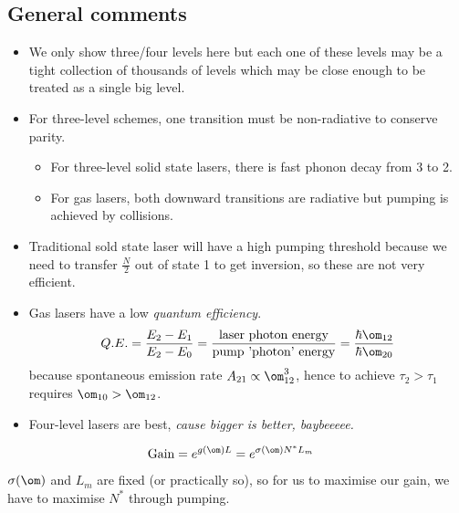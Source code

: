 \documentclass[a4paper, 11pt, normalem]{report}
\begin{document}
\subsection{General comments}
\begin{itemize}
    \item We only show three/four levels here but each one of these levels may be a tight collection of thousands of levels which may be close enough to be treated as a single big level.
    \item For three-level schemes, one transition must be non-radiative to conserve parity.
        \begin{itemize}
            \item For three-level solid state lasers, there is fast phonon decay from 3 to 2.
            \item For gas lasers, both downward transitions are radiative but pumping is achieved by collisions.
        \end{itemize}
    \item Traditional sold state laser will have a high pumping threshold because we need to transfer $\frac{N}{2}$ out of state 1 to get inversion, so these are not very efficient.
    \item Gas lasers have a low \emph{quantum efficiency}.
        \begin{equation}
            Q.E. = \frac{E_2-E_1}{E_2-E_0} = \frac{\text{laser photon energy}}{\text{pump 'photon' energy}} = \frac{\hbar\om_{12}}{\hbar\om_{20}}
        \end{equation}
        because spontaneous emission rate $A_{21}\propto\om_{12}^3$, hence to achieve $\tau_2>\tau_1$ requires $\om_{10}>\om_{12}$.
    \item Four-level lasers are best, \emph{cause bigger is better, baybeeeee.}
\end{itemize}
\begin{align}
    \text{Gain} &= e^{g(\om)L} = e^{\sigma(\om)N^*L_m}
\end{align}
$\sigma(\om)$ and $L_m$ are fixed (or practically so), so for us to maximise our gain, we have to maximise $N^*$ through pumping. 
\end{document}
